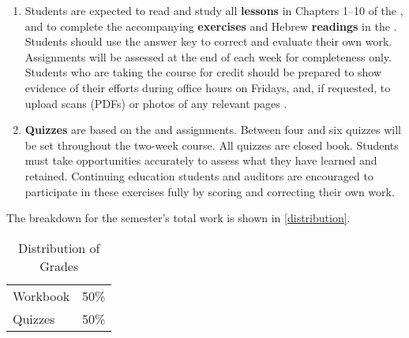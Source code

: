 \documentclass[titlepage]{article}
\begin{document}
\begin{enumerate}
 \item
    Students are expected to read and study all \textbf{lessons} in
    Chapters 1–10 of the \cite{lbh}, and to complete the accompanying
    \textbf{exercises} and Hebrew \textbf{readings} in the \cite{work}.
    Students should use the answer key to correct and evaluate their own
    work. Assignments will be assessed at the end of each week for
    completeness only. Students who are taking the course for credit
    should be prepared to show evidence of their efforts during office
    hours on Fridays, and, if requested, to upload scans (PDFs) or
    photos of any relevant pages \cite[3–34, 79–101]{work}.
 \item
    \textbf{Quizzes} are based on the \cite{lbh} and \cite{work}
    assignments. Between four and six quizzes will be set throughout the
    two-week course. All quizzes are closed book. Students must take
    opportunities accurately to assess what they have learned and
    retained. Continuing education students and auditors are encouraged
    to participate in these exercises fully by scoring and correcting
    their own work.

\end{enumerate}

The breakdown for the semester's total work is shown in
\autoref{distribution}.

\begin{table}[htbp]
  \centering
  {\lining
  \begin{tabular}{lr}
    \toprule
    Workbook & 50\% \\
    Quizzes  & 50\% \\
    \bottomrule
  \end{tabular}}
  \caption{Distribution of Grades}
  \label{distribution}
\end{table}
\end{document}
